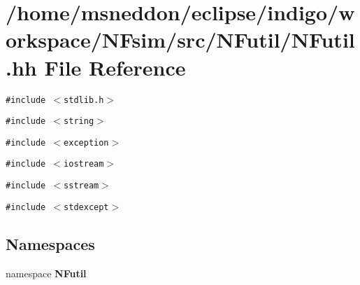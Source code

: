 \section{/home/msneddon/eclipse/indigo/workspace/NFsim/src/NFutil/NFutil.hh File Reference}
\label{NFutil_8hh}


{\tt \#include $<$stdlib.h$>$}\par
{\tt \#include $<$string$>$}\par
{\tt \#include $<$exception$>$}\par
{\tt \#include $<$iostream$>$}\par
{\tt \#include $<$sstream$>$}\par
{\tt \#include $<$stdexcept$>$}\par
\subsection*{Namespaces}
\begin{CompactItemize}
\item 
namespace {\bf NFutil}
\end{CompactItemize}
